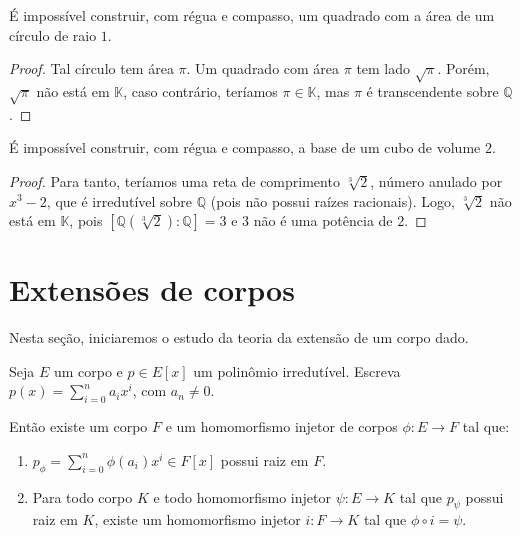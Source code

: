\begin{prop}
    É impossível construir, com régua e compasso, um quadrado com a área de um círculo de raio $1$.
\end{prop}
\begin{proof}
Tal círculo tem área $\pi$. Um quadrado com área $\pi$ tem lado $\sqrt \pi$. Porém, $\sqrt \pi$ não está em $\mathbb K$, caso contrário, teríamos $\pi \in \mathbb K$, mas $\pi$ é transcendente sobre $\mathbb Q$.
\end{proof}

\begin{prop}
É impossível construir, com régua e compasso, a base de um cubo de volume $2$.
\end{prop}
\begin{proof}
    Para tanto, teríamos uma reta de comprimento $\sqrt[3]{2}$, número anulado por $x^3-2$, que é irredutível sobre $\mathbb Q$ (pois não possui raízes racionais). Logo, $\sqrt[3]{2}$ não está em $\mathbb K$, pois $[\mathbb Q(\sqrt[3]{2}):\mathbb Q]=3$ e $3$ não é uma potência de $2$.
\end{proof}

\section{Extensões de corpos}

Nesta seção, iniciaremos o estudo da teoria da extensão de um corpo dado.

\begin{prop}
    Seja $E$ um corpo e $p \in E[x]$ um polinômio irredutível.
    Escreva $p(x)=\sum_{i=0}^n a_i x^i$, com $a_n\neq 0$.

    Então existe um corpo $F$ e um homomorfismo injetor de corpos $\phi: E\rightarrow F$ tal que:
    
    \begin{enumerate}[label=(\roman*)]
        \item $p_\phi=\sum_{i=0}^n \phi(a_i)x^i\in F[x]$ possui raiz em $F$.
        \item Para todo corpo $K$ e todo homomorfismo injetor $\psi:E\rightarrow K$ tal que $p_\psi$ possui raiz em $K$, existe um homomorfismo injetor $i:F\rightarrow K$ tal que $\phi\circ i=\psi$.
    \end{enumerate}
\end{prop}

